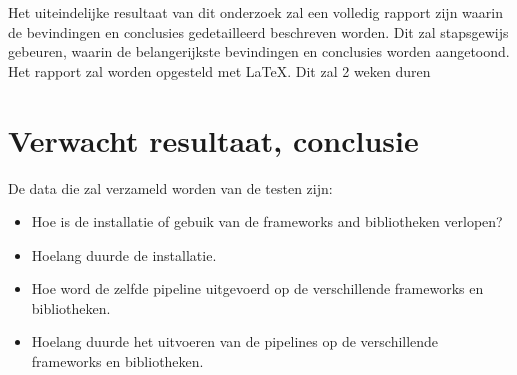 Het uiteindelijke resultaat van dit onderzoek zal een volledig rapport zijn waarin de bevindingen en conclusies  gedetailleerd beschreven worden. Dit zal stapsgewijs gebeuren, waarin de belangerijkste bevindingen en conclusies worden aangetoond. Het rapport zal worden opgesteld met LaTeX. Dit zal 2 weken duren\\






\section{Verwacht resultaat, conclusie}%
\label{sec:verwachte_resultaten}
De data die zal verzameld worden van de testen zijn:
\begin{itemize}
  \item Hoe is de installatie of gebuik van de frameworks and bibliotheken verlopen?
  \item Hoelang duurde de installatie.
  \item Hoe word de zelfde pipeline uitgevoerd op de verschillende frameworks en bibliotheken.
  \item Hoelang duurde het uitvoeren van de pipelines op de verschillende frameworks en bibliotheken.
\end{itemize}

